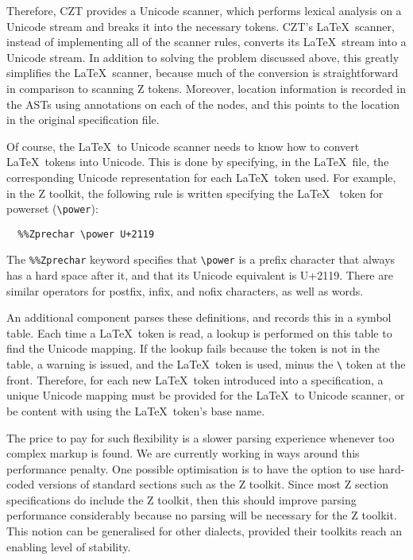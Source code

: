 \documentclass{llncs}
\begin{document}
Therefore, CZT provides a Unicode scanner, which performs lexical
analysis on a Unicode stream and breaks it into the necessary
tokens. CZT's \LaTeX~scanner, instead of implementing all of the
scanner rules, converts its \LaTeX~stream into a Unicode stream. In
addition to solving the problem discussed above, this greatly
simplifies the \LaTeX~scanner, because much of the conversion is
straightforward in comparison to scanning Z tokens. Moreover, location
information is recorded in the ASTs using annotations on each of the
nodes, and this points to the location in the original specification file.

Of course, the \LaTeX~to Unicode scanner needs to know how to convert
\LaTeX~tokens into Unicode. This is done by specifying, in the \LaTeX\ file,
the corresponding Unicode representation for each \LaTeX~token used. For example, in
the Z toolkit, the following rule is written specifying the \LaTeX~
token for powerset (\verb+\power+):
\begin{verbatim}
  %%Zprechar \power U+2119
\end{verbatim}

The {\tt \%\%Zprechar} keyword specifies that \verb+\power+ is a
prefix character that always has a hard space after it, and
that its Unicode equivalent is U+2119. There are similar operators for
postfix, infix, and nofix characters, as well as words.

An additional component parses these definitions, and records this in
a symbol table. Each time a \LaTeX~token is read, a lookup is
performed on this table to find the Unicode mapping. If the lookup
fails because the token is not in the table, a warning is issued, and
the \LaTeX~token is used, minus the \verb+\+ token at the
front. Therefore, for each new \LaTeX~token introduced into a
specification, a unique Unicode mapping must be provided for the
\LaTeX~to Unicode scanner, or be content with using the \LaTeX~token's
base name.

The price to pay for such flexibility is a slower parsing experience
whenever too complex markup is found.
We are currently working in ways around this performance penalty.
One possible optimisation is to have the option to use hard-coded versions
of standard sections such as the Z toolkit.
Since most Z section specifications do include the Z toolkit, then this should
improve parsing performance considerably because no parsing will be necessary for
the Z toolkit.
This notion can be generalised for other dialects, provided their toolkits reach
an enabling level of stability.
\end{document}
